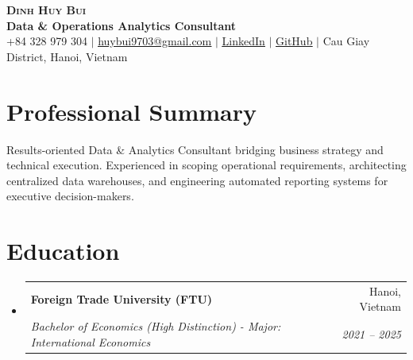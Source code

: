 \documentclass[letterpaper,11pt]{article}
\makeatletter
\newcommand{\resumeSubheading}[4]{
  \vspace{2pt}\item
    \begin{tabular*}{\textwidth}[t]{l@{\extracolsep{\fill}}r}
      \textbf{#1} & #2 \\
      \textit{\small#3} & \textit{\small #4} \\
    \end{tabular*}\vspace{-2pt}
}
\newcommand{\resumeSubHeadingListStart}{\begin{itemize}[leftmargin=0.15in, label={}]}
\newcommand{\resumeSubHeadingListEnd}{\end{itemize}}
\makeatother
\begin{document}
\begin{center}
    \textbf{\Huge \scshape Dinh Huy Bui} \\ \vspace{3pt}
    \small \textbf{\color{NavyBlue} Data \& Operations Analytics Consultant} \\ \vspace{4pt}
    \small +84 328 979 304 $|$ \href{mailto:huybui9703@gmail.com}{\underline{huybui9703@gmail.com}} $|$ 
    \href{https://www.linkedin.com/in/dinh-huy-bui/}{\underline{LinkedIn}} $|$
    \href{https://github.com/dinhhuybui}{\underline{GitHub}} $|$
    Cau Giay District, Hanoi, Vietnam
\end{center}

\vspace{2pt}

\section*{Professional Summary}
\small{Results-oriented Data \& Analytics Consultant bridging business strategy and technical execution. Experienced in scoping operational requirements, architecting centralized data warehouses, and engineering automated reporting systems for executive decision-makers.}

\section*{Education}
  \resumeSubHeadingListStart
    \resumeSubheading
      {Foreign Trade University (FTU)}{Hanoi, Vietnam}
      {Bachelor of Economics (High Distinction) - Major: International Economics}{2021 -- 2025}
  \resumeSubHeadingListEnd

\end{document}
